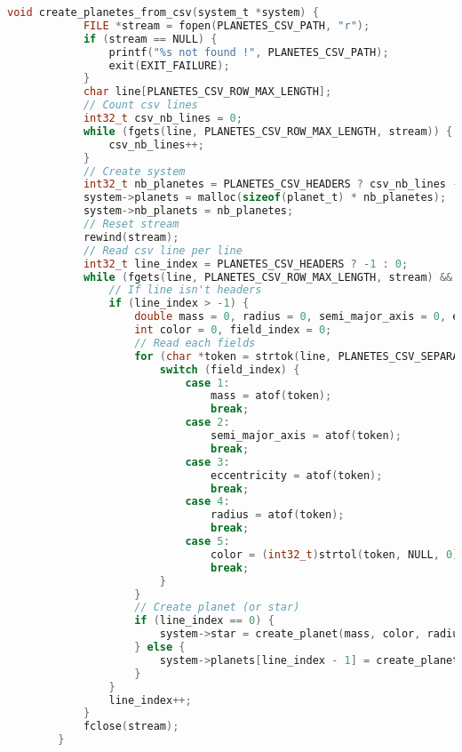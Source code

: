 \documentclass[a4paper,10pt]{article}
\begin{document}
    \begin{lstlisting}[language=c,label={lst:lstlisting7}]
        void create_planetes_from_csv(system_t *system) {
            FILE *stream = fopen(PLANETES_CSV_PATH, "r");
            if (stream == NULL) {
                printf("%s not found !", PLANETES_CSV_PATH);
                exit(EXIT_FAILURE);
            }
            char line[PLANETES_CSV_ROW_MAX_LENGTH];
            // Count csv lines
            int32_t csv_nb_lines = 0;
            while (fgets(line, PLANETES_CSV_ROW_MAX_LENGTH, stream)) {
                csv_nb_lines++;
            }
            // Create system
            int32_t nb_planetes = PLANETES_CSV_HEADERS ? csv_nb_lines - 2 : csv_nb_lines - 1;
            system->planets = malloc(sizeof(planet_t) * nb_planetes);
            system->nb_planets = nb_planetes;
            // Reset stream
            rewind(stream);
            // Read csv line per line
            int32_t line_index = PLANETES_CSV_HEADERS ? -1 : 0;
            while (fgets(line, PLANETES_CSV_ROW_MAX_LENGTH, stream) && line_index - 1 < nb_planetes) {
                // If line isn't headers
                if (line_index > -1) {
                    double mass = 0, radius = 0, semi_major_axis = 0, eccentricity = 0;
                    int color = 0, field_index = 0;
                    // Read each fields
                    for (char *token = strtok(line, PLANETES_CSV_SEPARATOR); token != NULL; token = strtok(NULL, PLANETES_CSV_SEPARATOR), field_index++) {
                        switch (field_index) {
                            case 1:
                                mass = atof(token);
                                break;
                            case 2:
                                semi_major_axis = atof(token);
                                break;
                            case 3:
                                eccentricity = atof(token);
                                break;
                            case 4:
                                radius = atof(token);
                                break;
                            case 5:
                                color = (int32_t)strtol(token, NULL, 0);
                                break;
                        }
                    }
                    // Create planet (or star)
                    if (line_index == 0) {
                        system->star = create_planet(mass, color, radius, semi_major_axis, eccentricity, true);
                    } else {
                        system->planets[line_index - 1] = create_planet(mass, color, radius, semi_major_axis, eccentricity, false);
                    }
                }
                line_index++;
            }
            fclose(stream);
        }
    \end{lstlisting}
    
\end{document}
